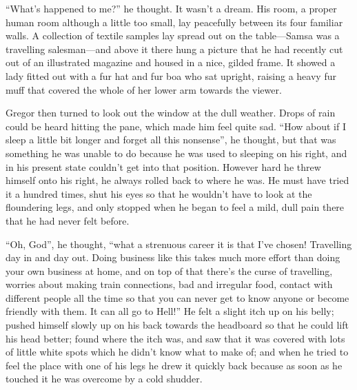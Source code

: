“What’s happened to me?” he thought. It wasn’t a dream. His room, a
proper human room although a little too small, lay peacefully between
its four familiar walls. A collection of textile samples lay spread out
on the table—Samsa was a travelling salesman—and above it there hung a
picture that he had recently cut out of an illustrated magazine and
housed in a nice, gilded frame. It showed a lady fitted out with a fur
hat and fur boa who sat upright, raising a heavy fur muff that covered
the whole of her lower arm towards the viewer.

Gregor then turned to look out the window at the dull weather. Drops of
rain could be heard hitting the pane, which made him feel quite sad.
“How about if I sleep a little bit longer and forget all this
nonsense”, he thought, but that was something he was unable to do
because he was used to sleeping on his right, and in his present state
couldn’t get into that position. However hard he threw himself onto his
right, he always rolled back to where he was. He must have tried it a
hundred times, shut his eyes so that he wouldn’t have to look at the
floundering legs, and only stopped when he began to feel a mild, dull
pain there that he had never felt before.

“Oh, God”, he thought, “what a strenuous career it is that I’ve chosen!
Travelling day in and day out. Doing business like this takes much more
effort than doing your own business at home, and on top of that there’s
the curse of travelling, worries about making train connections, bad
and irregular food, contact with different people all the time so that
you can never get to know anyone or become friendly with them. It can
all go to Hell!” He felt a slight itch up on his belly; pushed himself
slowly up on his back towards the headboard so that he could lift his
head better; found where the itch was, and saw that it was covered with
lots of little white spots which he didn’t know what to make of; and
when he tried to feel the place with one of his legs he drew it quickly
back because as soon as he touched it he was overcome by a cold
shudder.

